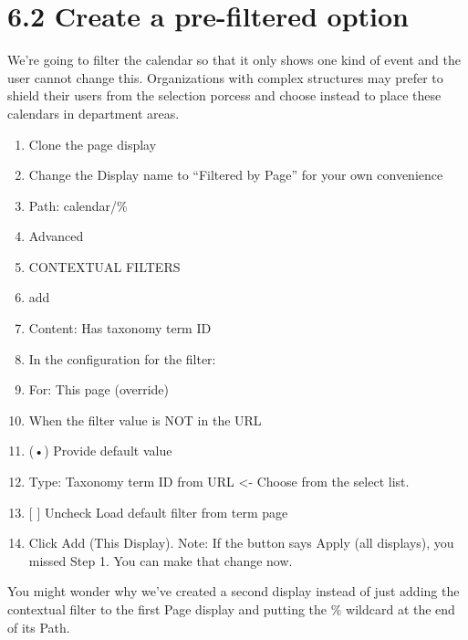 \documentclass[letterpaper,10pt,english]{sphinxmanual}
\begin{document}
\section{6.2 Create a pre-filtered option}
\label{event_calendar:create-a-pre-filtered-option}
We're going to filter the calendar so that it only shows one kind of event and the user cannot change this. Organizations with complex structures  may prefer to shield their users from the selection porcess and choose instead to place these calendars in department areas.
\begin{enumerate}
\item {} 
Clone the page display

\item {} 
Change the Display name to ``Filtered by Page'' for your own convenience

\item {} 
Path: calendar/\%

\item {} 
Advanced

\item {} 
CONTEXTUAL FILTERS

\item {} 
add

\item {} 
Content: Has taxonomy term ID

\item {} 
In the configuration for the filter:

\item {} 
For: This page (override)

\item {} 
When the filter value is NOT in the URL

\item {} 
(•) Provide default value

\item {} 
Type: Taxonomy term ID from URL \textless{}- Choose from the select list.

\item {} 
{[} {]} Uncheck Load default filter from term page

\item {} 
Click Add (This Display). Note: If the button says Apply (all displays), you missed Step 1. You can make that change now.

\end{enumerate}

You might wonder why we've created a second display instead of just adding the contextual filter to the first Page display and putting the \% wildcard at the end of its Path.
\end{document}
